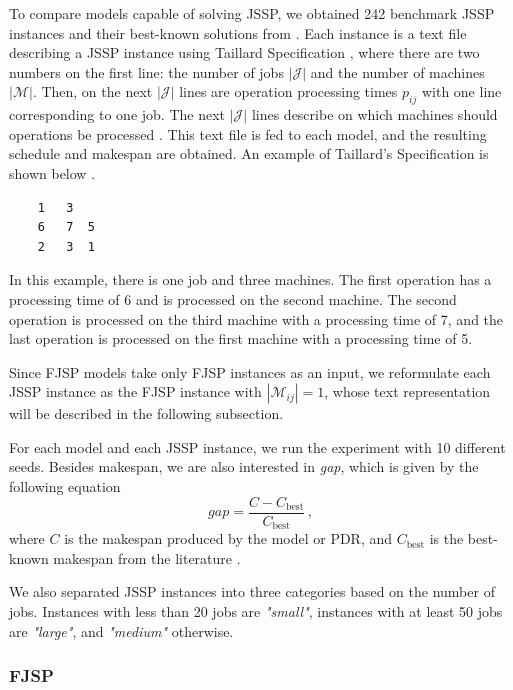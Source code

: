 To compare models capable of solving JSSP, we obtained 242 benchmark JSSP instances and their best-known solutions from \cite{jssp_benchmarks}. Each instance is a text file describing a JSSP instance using Taillard Specification \cite{taillard_specification}, where there are two numbers on the first line: the number of jobs $|\mathcal{J}|$ and the number of machines $|\mathcal{M}|$. Then, on the next $|\mathcal{J}|$ lines are operation processing times $p_{ij}$ with one line corresponding to one job. The next $|\mathcal{J}|$ lines describe on which machines should operations be processed \cite{jssp_benchmarks}. This text file is fed to each model, and the resulting schedule and makespan are obtained.  An example of Taillard's Specification is shown below \cite{jssp_benchmarks}.
\begin{verbatim}
    1   3
    6   7  5
    2   3  1    
\end{verbatim}
In this example, there is one job and three machines. The first operation has a processing time of 6 and is processed on the second machine. The second operation is processed on the third machine with a processing time of 7, and the last operation is processed on the first machine with a processing time of 5.
\par
Since FJSP models take only FJSP instances as an input, we reformulate each JSSP instance as the FJSP instance with $|\mathcal{M}_{ij}| = 1$, whose text representation will be described in the following subsection. 
\par
For each model and each JSSP instance, we run the experiment with 10 different seeds. Besides makespan, we are also interested in \textit{gap}, which is given by the following equation
\begin{equation}
    gap  = \frac{C - C_\text{best}}{C_\text{best}} \, ,
\end{equation}
where $C$ is the makespan produced by the model or PDR, and $C_\text{best}$ is the best-known makespan from the literature \cite{jssp_benchmarks}.
\par
We also separated JSSP instances into three categories based on the number of jobs. Instances with less than 20 jobs are \textit{"small"}, instances with at least 50 jobs are \textit{"large"}, and \textit{"medium"} otherwise.

\subsubsection{FJSP}

